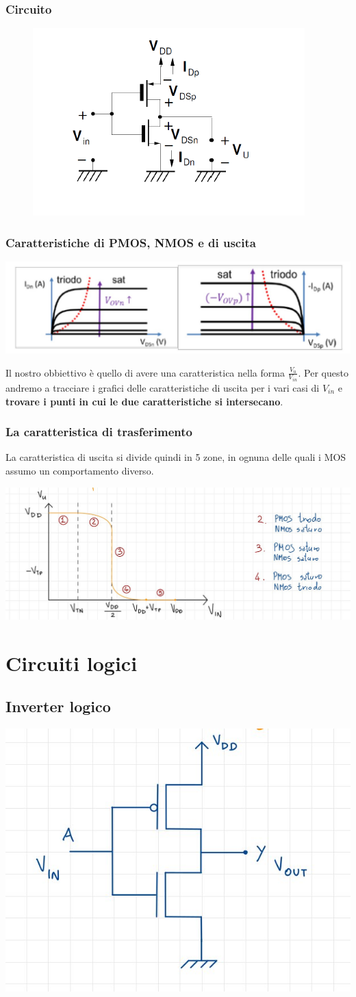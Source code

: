 \documentclass[11pt,a4paper,]{article}
\begin{document}
\subsubsection{Circuito}
\begin{figure}[H]
    \centering
    \includegraphics[width=0.25\linewidth]{img/in cmos.png}
\end{figure}
\subsubsection{Caratteristiche di PMOS, NMOS e di uscita}
\begin{center}
	\includegraphics[width=0.5\linewidth]{"img/car cmos inv"}
\end{center}
Il nostro obbiettivo è quello di avere una caratteristica nella forma $\frac{V_u}{V_{in}}$.
Per questo andremo a tracciare i grafici delle caratteristiche di uscita per i vari casi di $V_{in}$ e \textbf{trovare i punti in cui le due caratteristiche si intersecano}.
\subsubsection{La caratteristica di trasferimento}
La caratteristica di uscita si divide quindi in 5 zone, in ognuna delle quali i MOS assumo un comportamento diverso.
\begin{center}
	\includegraphics[width=0.5\linewidth]{"img/5 zone car di t"}
\end{center}
\section{Circuiti logici}
\subsection{Inverter logico}
\begin{center}
	\includegraphics[width=0.3\linewidth]{"img/inv logic"}
\end{center}
\end{document}
